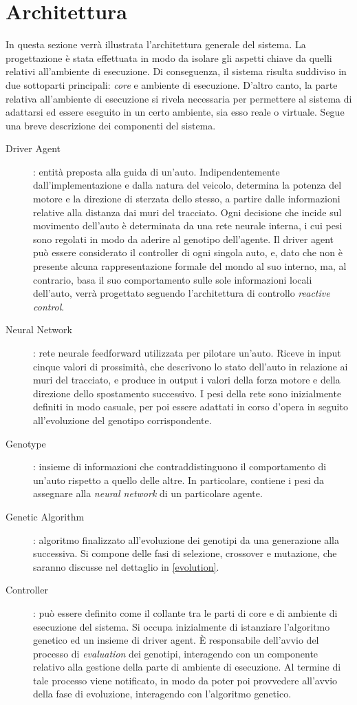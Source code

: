 \documentclass[a4paper,12pt]{article}
\begin{document}
\section{Architettura} \label{architecture}
In questa sezione verrà illustrata l'architettura generale del sistema. La progettazione è stata effettuata in modo da isolare gli aspetti chiave da quelli relativi all'ambiente di esecuzione. Di conseguenza, il sistema risulta suddiviso in due sottoparti principali: \emph{core} e ambiente di esecuzione. D'altro canto, la parte relativa all'ambiente di esecuzione si rivela necessaria per permettere al sistema di adattarsi ed essere eseguito in un certo ambiente, sia esso reale o virtuale. Segue una breve descrizione dei componenti del sistema.
\begin{description}
	\item[Driver Agent]: entità preposta alla guida di un'auto. Indipendentemente dall'implementazione e dalla natura del veicolo, determina la potenza del motore e la direzione di sterzata dello stesso, a partire dalle informazioni relative alla distanza dai muri del tracciato. Ogni decisione che incide sul movimento dell'auto è determinata da una rete neurale interna, i cui pesi sono regolati in modo da aderire al genotipo dell'agente. Il driver agent può essere considerato il controller di ogni singola auto, e, dato che non è presente alcuna rappresentazione formale del mondo al suo interno, ma, al contrario, basa il suo comportamento sulle sole informazioni locali dell'auto, verrà progettato seguendo l'architettura di controllo \emph{reactive control}. 
	\item[Neural Network]: rete neurale feedforward utilizzata per pilotare un'auto. Riceve in input cinque valori di prossimità, che descrivono lo stato dell'auto in relazione ai muri del tracciato, e produce in output i valori della forza motore e della direzione dello spostamento successivo. I pesi della rete sono inizialmente definiti in modo casuale, per poi essere adattati in corso d'opera in seguito all'evoluzione del genotipo corrispondente.
	\item[Genotype]: insieme di informazioni che contraddistinguono il comportamento di un'auto rispetto a quello delle altre. In particolare, contiene i pesi da assegnare alla \emph{neural network} di un particolare agente.
	\item[Genetic Algorithm]: algoritmo finalizzato all'evoluzione dei genotipi da una generazione alla successiva. Si compone delle fasi di selezione, crossover e mutazione, che saranno discusse nel dettaglio in \autoref{evolution}.
	\item[Controller]: può essere definito come il collante tra le parti di core e di ambiente di esecuzione del sistema. Si occupa inizialmente di istanziare l'algoritmo genetico ed un insieme di driver agent. È responsabile dell'avvio del processo di \emph{evaluation} dei genotipi, interagendo con un componente relativo alla gestione della parte di ambiente di esecuzione. Al termine di tale processo viene notificato, in modo da poter poi provvedere all'avvio della fase di evoluzione, interagendo con l'algoritmo genetico.
\end{description}
\end{document}
